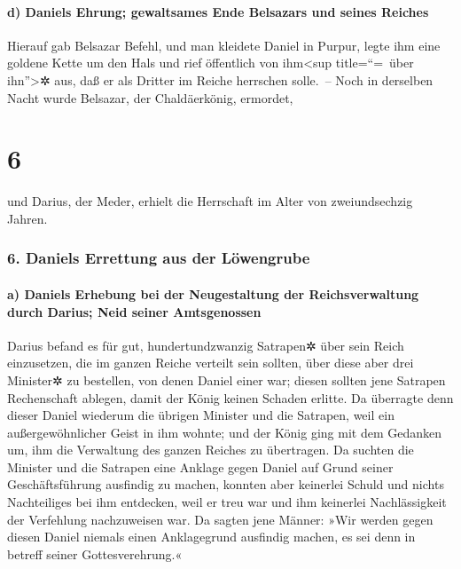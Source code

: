 \hypertarget{d-daniels-ehrung-gewaltsames-ende-belsazars-und-seines-reiches}{%
\paragraph{d) Daniels Ehrung; gewaltsames Ende Belsazars und seines
Reiches}\label{d-daniels-ehrung-gewaltsames-ende-belsazars-und-seines-reiches}}

Hierauf gab Belsazar Befehl, und man kleidete Daniel in
Purpur, legte ihm eine goldene Kette um den Hals und rief öffentlich von
ihm\textless sup title=``=~über ihn''\textgreater✲ aus, daß er als
Dritter im Reiche herrschen solle.~-- Noch in derselben
Nacht wurde Belsazar, der Chaldäerkönig, ermordet,

\hypertarget{section-5}{%
\section{6}\label{section-5}}

und Darius, der Meder, erhielt die Herrschaft im Alter von
zweiundsechzig Jahren.

\hypertarget{daniels-errettung-aus-der-luxf6wengrube}{%
\subsubsection{6. Daniels Errettung aus der
Löwengrube}\label{daniels-errettung-aus-der-luxf6wengrube}}

\hypertarget{a-daniels-erhebung-bei-der-neugestaltung-der-reichsverwaltung-durch-darius-neid-seiner-amtsgenossen}{%
\paragraph{a) Daniels Erhebung bei der Neugestaltung der
Reichsverwaltung durch Darius; Neid seiner
Amtsgenossen}\label{a-daniels-erhebung-bei-der-neugestaltung-der-reichsverwaltung-durch-darius-neid-seiner-amtsgenossen}}

Darius befand es für gut, hundertundzwanzig Satrapen✲ über
sein Reich einzusetzen, die im ganzen Reiche verteilt sein sollten,
über diese aber drei Minister✲ zu bestellen, von denen
Daniel einer war; diesen sollten jene Satrapen Rechenschaft ablegen,
damit der König keinen Schaden erlitte. Da überragte denn
dieser Daniel wiederum die übrigen Minister und die Satrapen, weil ein
außergewöhnlicher Geist in ihm wohnte; und der König ging mit dem
Gedanken um, ihm die Verwaltung des ganzen Reiches zu übertragen.
Da suchten die Minister und die Satrapen eine Anklage
gegen Daniel auf Grund seiner Geschäftsführung ausfindig zu machen,
konnten aber keinerlei Schuld und nichts Nachteiliges bei ihm entdecken,
weil er treu war und ihm keinerlei Nachlässigkeit der Verfehlung
nachzuweisen war. Da sagten jene Männer: »Wir werden gegen
diesen Daniel niemals einen Anklagegrund ausfindig machen, es sei denn
in betreff seiner Gottesverehrung.«

